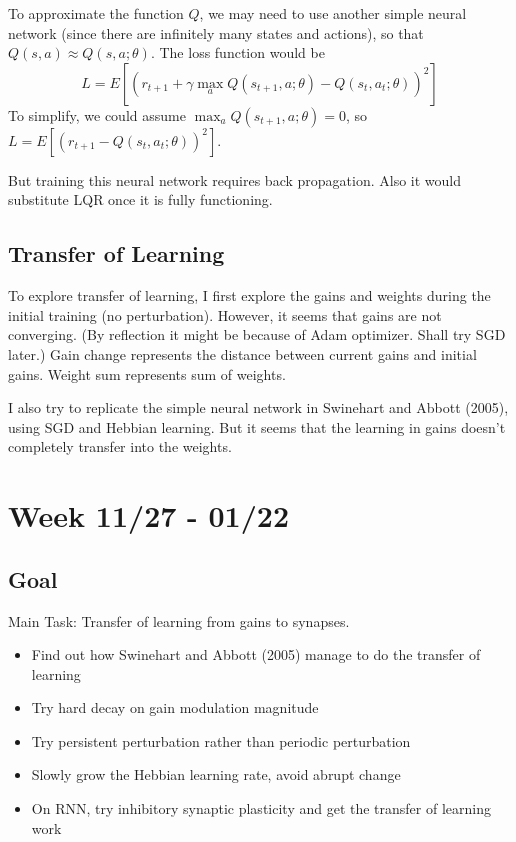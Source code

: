 \documentclass[12pt, a4paper]{article}
\begin{document}
To approximate the function $Q$, we may need to use another simple neural network (since there are infinitely many states and actions), so that $Q(s,a) \approx Q(s,a;\theta)$. The loss function would be 
$$ L = E \left[ \left( r_{t+1} + \gamma \max_{a} Q(s_{t+1},a; \theta) - Q(s_t, a_t; \theta) \right)^2 \right] $$
To simplify, we could assume $\max_{a} Q(s_{t+1}, a; \theta) = 0$, so $ L = E \left[ \left( r_{t+1} - Q(s_t, a_t; \theta) \right)^2 \right] $. 

But training this neural network requires back propagation. Also it would substitute LQR once it is fully functioning.

\newpage

\subsection*{Transfer of Learning}

To explore transfer of learning, I first explore the gains and weights during the initial training (no perturbation). However, it seems that gains are not converging. (By reflection it might be because of Adam optimizer. Shall try SGD later.) Gain change represents the distance between current gains and initial gains. Weight sum represents sum of weights.

I also try to replicate the simple neural network in Swinehart and Abbott (2005), using SGD and Hebbian learning. But it seems that the learning in gains doesn't completely transfer into the weights.

\newpage


\section*{Week 11/27 - 01/22}

\subsection*{Goal}

\noindent
Main Task: Transfer of learning from gains to synapses.

\begin{itemize}
    \item Find out how Swinehart and Abbott (2005) manage to do the transfer of learning
    \item Try hard decay on gain modulation magnitude
    \item Try persistent perturbation rather than periodic perturbation
    \item Slowly grow the Hebbian learning rate, avoid abrupt change
    \item On RNN, try inhibitory synaptic plasticity and get the transfer of learning work
\end{itemize}
\end{document}
